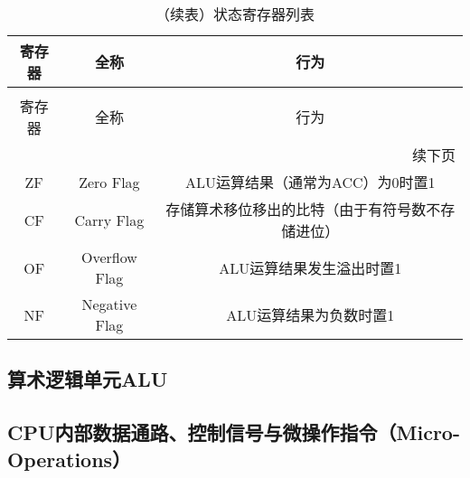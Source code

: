 \documentclass[lang=cn,a4paper,newtx]{elegantpaper}
\begin{document}
\begin{longtable}{c c c}
  \caption{状态寄存器列表} \label{tab:CPU:status} \\
  \toprule
  寄存器 & 全称 & 行为 \\ 
  \midrule
  \endfirsthead

  \caption[]{（续表）状态寄存器列表} \\
  \toprule
  寄存器 & 全称 & 行为\\
  \midrule
  \endhead

  \midrule
  \multicolumn{3}{r}{续下页} \\
  \midrule
  \endfoot

  \bottomrule
  \endlastfoot

  ZF   & Zero Flag             & ALU运算结果（通常为ACC）为0时置1\\
  CF  & Carry Flag     & 存储算术移位移出的比特（由于有符号数不存储进位）\\
  OF  & Overflow Flag &  ALU运算结果发生溢出时置1\\
  NF  & Negative Flag &  ALU运算结果为负数时置1\\
\end{longtable}
\subsection{算术逻辑单元ALU}

\subsection{CPU内部数据通路、控制信号与微操作指令（Micro-Operations）}
\end{document}
